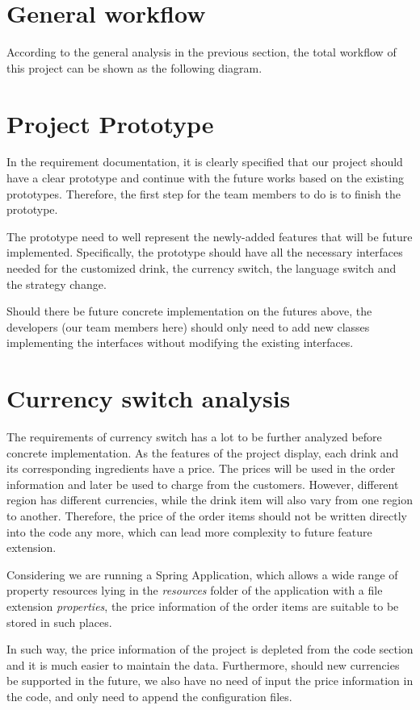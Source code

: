 \documentclass[a4paper]{report}
\begin{document}
\section{General workflow}
According to the general analysis in the previous section, the total workflow of this project can be shown as the following diagram.

\section{Project Prototype}
In the requirement documentation, it is clearly specified that our project should have a clear prototype and continue with the future works based on the existing prototypes. Therefore, the first step for the team members to do is to finish the prototype. 
\par
The prototype need to well represent the newly-added features that will be future implemented. Specifically, the prototype should have all the necessary interfaces needed for the customized drink, the currency switch, the language switch and the strategy change.
\par
Should there be future concrete implementation on the futures above, the developers (our team members here) should only need to add new classes implementing the interfaces without modifying the existing interfaces.
\section{Currency switch analysis}
The requirements of currency switch has a lot to be further analyzed before concrete implementation. As the features of the project display, each drink and its corresponding ingredients have a price. The prices will be used in the order information and later be used to charge from the customers. However, different region has different currencies, while the drink item will also vary from one region to another. Therefore, the price of the order items should not be written directly into the code any more, which can lead more complexity to future feature extension. 
\par
Considering we are running a Spring Application, which allows a wide range of property resources lying in the \emph{resources} folder of the application with a file extension \emph{properties}, the price information of the order items are suitable to be stored in such places. 
\par
In such way, the price information of the project is depleted from the code section and it is much easier to maintain the data. Furthermore, should new currencies be supported in the future, we also have no need of input the price information in the code, and only need to append the configuration files.
\end{document}
